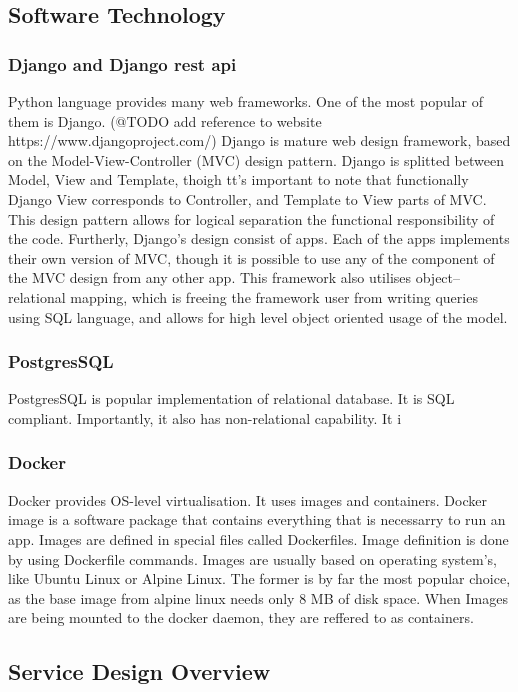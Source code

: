 \subsection{Software Technology}

\subsubsection{Django and Django rest api}
Python language provides many web frameworks.
One of the most popular of them is Django. 
(@TODO add reference to website https://www.djangoproject.com/)
Django is mature web design framework, based on the Model-View-Controller (MVC) design pattern. Django is splitted between Model, View and Template, thoigh
tt's important to note that functionally Django View corresponds to Controller, and Template to View parts of MVC.
This design pattern allows for logical separation the functional responsibility of the code.
Furtherly, Django's design consist of apps. Each of the apps implements their own version of MVC, though it is possible to use any of the component of the MVC design from any other app.
This framework also utilises object–relational mapping, which is freeing the framework user from writing queries using SQL language, and allows for high level object oriented usage of the model.

\subsubsection{PostgresSQL}
PostgresSQL is popular implementation of relational database. It is SQL compliant. Importantly, it also has non-relational capability. It i

\subsubsection{Docker}

Docker provides OS-level virtualisation. It uses images and containers. Docker image is a software package that contains everything that is necessarry to run an app.
Images are defined in special files called Dockerfiles. Image definition is done by using Dockerfile commands.
Images are usually based on operating system's, like Ubuntu Linux or Alpine Linux.
The former is by far the most popular choice, as the base image from alpine linux needs only 8 MB of disk space.
When Images are being mounted to the docker daemon, they are reffered to as containers.

\subsection{Service Design Overview}


